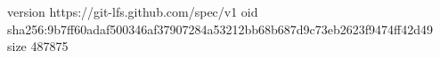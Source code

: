 version https://git-lfs.github.com/spec/v1
oid sha256:9b7ff60adaf500346af37907284a53212bb68b687d9c73eb2623f9474ff42d49
size 487875
